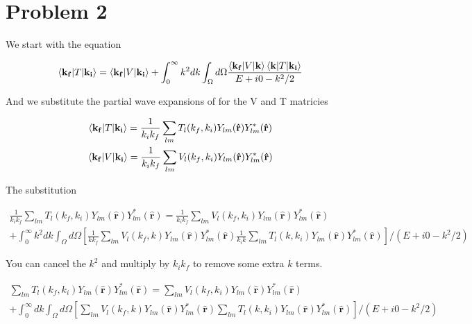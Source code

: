 \documentclass{article}
\renewcommand{\vec}[1]{\mathbf{#1}}
\let\oldhat\hat
\renewcommand{\hat}[1]{\oldhat{\mathbf{#1}}}
\begin{document}
     \section{Problem 2}
     
     We start with the equation
     
     \begin{gather}
     	\braket{\vec{k_f}}{T|\vec{k_i}} = \braket{\vec{k_f}}{V|\vec{k_i}} + \int_{0}^{\infty} k^2dk \int_{\Omega} d\Omega \frac{ \braket{\vec{k_f}}{V|\vec{k}} \braket{\vec{k}}{T|\vec{k_i}}}{E + i0 -k^2/2}
     \end{gather}
     
     And we substitute the partial wave expansions of for the V and T matricies
     
     \begin{gather}
     	\braket{\vec{k_f}}{T|\vec{k_i}} = \frac{1}{k_ik_f}\sum_{lm}T_l(k_f,k_i)Y_{lm}(\vec{\hat{r}}) Y_{lm}^*(\vec{\hat{r}})\\
     	\braket{\vec{k_f}}{V|\vec{k_i}} = \frac{1}{k_ik_f}\sum_{lm}V_l(k_f,k_i)Y_{lm}(\vec{\hat{r}}) Y_{lm}^*(\vec{\hat{r}})
     \end{gather}

     The substitution
     
     \begin{gather}
     	\frac{1}{k_ik_f}\sum_{lm}T_l(k_f,k_i)Y_{lm}(\vec{\hat{r}}) Y_{lm}^*(\vec{\hat{r}}) = \frac{1}{k_ik_f}\sum_{lm}V_l(k_f,k_i)Y_{lm}(\vec{\hat{r}}) Y_{lm}^*(\vec{\hat{r}})\\
     	+ \int_{0}^{\infty} k^2dk \int_{\Omega} d\Omega \left[ \frac{1}{kk_f}\sum_{lm}V_l(k_f,k)Y_{lm}(\vec{\hat{r}}) Y_{lm}^*(\vec{\hat{r}}) \frac{1}{k_ik}\sum_{lm}T_l(k,k_i)Y_{lm}(\vec{\hat{r}}) Y_{lm}^*(\vec{\hat{r}}) \right]/(E + i0 -k^2/2)
     \end{gather}

    You can cancel the $k^2$ and multiply by $k_i k_f$ to remove some extra $k$ terms.
    
    \begin{gather}
    	\sum_{lm}T_l(k_f,k_i)Y_{lm}(\vec{\hat{r}}) Y_{lm}^*(\vec{\hat{r}}) = \sum_{lm}V_l(k_f,k_i)Y_{lm}(\vec{\hat{r}}) Y_{lm}^*(\vec{\hat{r}})\\
    	+ \int_{0}^{\infty} dk \int_{\Omega} d\Omega \left[\sum_{lm}V_l(k_f,k)Y_{lm}(\vec{\hat{r}}) Y_{lm}^*(\vec{\hat{r}}) \sum_{lm}T_l(k,k_i)Y_{lm}(\vec{\hat{r}}) Y_{lm}^*(\vec{\hat{r}})\right]/\left(E + i0 -k^2/2\right)
    \end{gather}
    
\end{document}

